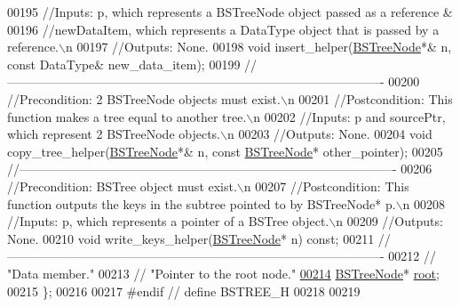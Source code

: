 \begin{DoxyCode}
00195     \textcolor{comment}{//Inputs: p, which represents a BSTreeNode object passed as a reference & }
00196     \textcolor{comment}{//newDataItem, which represents a DataType object that is passed by a reference.\(\backslash\)n}
00197     \textcolor{comment}{//Outputs: None.}
00198     \textcolor{keywordtype}{void} insert\_helper(\hyperlink{class_b_s_tree_1_1_b_s_tree_node}{BSTreeNode}*& n, \textcolor{keyword}{const} DataType& new\_data\_item);
00199     \textcolor{comment}{//-------------------------------------------------------------------------------------------}
00200     \textcolor{comment}{//Precondition: 2 BSTreeNode objects must exist.\(\backslash\)n}
00201     \textcolor{comment}{//Postcondition: This function makes a tree equal to another tree.\(\backslash\)n}
00202     \textcolor{comment}{//Inputs: p and sourcePtr, which represent 2 BSTreeNode objects.\(\backslash\)n}
00203     \textcolor{comment}{//Outputs: None.}
00204     \textcolor{keywordtype}{void} copy\_tree\_helper(\hyperlink{class_b_s_tree_1_1_b_s_tree_node}{BSTreeNode}*& n, \textcolor{keyword}{const} \hyperlink{class_b_s_tree_1_1_b_s_tree_node}{BSTreeNode}* other\_pointer);
00205     \textcolor{comment}{//-------------------------------------------------------------------------------------------}
00206     \textcolor{comment}{//Precondition: BSTree object must exist.\(\backslash\)n}
00207     \textcolor{comment}{//Postcondition: This function outputs the keys in the subtree pointed to by BSTreeNode* p.\(\backslash\)n}
00208     \textcolor{comment}{//Inputs: p, which represents a pointer of a BSTree object.\(\backslash\)n}
00209     \textcolor{comment}{//Outputs: None.}
00210     \textcolor{keywordtype}{void} write\_keys\_helper(\hyperlink{class_b_s_tree_1_1_b_s_tree_node}{BSTreeNode}* n) \textcolor{keyword}{const};
00211     \textcolor{comment}{//-------------------------------------------------------------------------------------------}
00212     \textcolor{comment}{// "Data member."}
00213     \textcolor{comment}{// "Pointer to the root node."}
\hypertarget{_b_s_tree_8h_source_l00214}{}\hyperlink{class_b_s_tree_a83534afce9094181ac031f9f596a8625}{00214}     \hyperlink{class_b_s_tree_1_1_b_s_tree_node}{BSTreeNode}* \hyperlink{class_b_s_tree_a83534afce9094181ac031f9f596a8625}{root};   
00215 \};
00216 
00217 \textcolor{preprocessor}{#endif  // define BSTREE\_H}
00218 
00219 
\end{DoxyCode}
